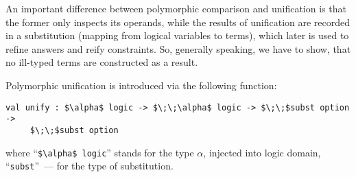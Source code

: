 \documentclass[10pt, oneside, nocopyrightspace]{sigplanconf}
\begin{document}
\begin{comment}
Like polymorphic comparison, polymorphic unification performs traversal
of values, exploiting intrinsic knowledge of their runtime representation. 
The undeniable benefit of this solution is that in order to perform unification 
for user types no ``boilerplate'' code is needed. 
\end{comment}
\begin{comment}
On the other hand, all pitfalls of
polymorphic comparison are inherited as well; in particular, unification can loop 
for cyclic data structures and does not work for functional values. Since we generally 
do not expect any reasonable outcome in these cases, the only remaining problem is that
the compiler is incapable to provide any assistance in identifying 
and avoiding them. Another drawback is that the implementation of polymorphic unification
relies on runtime representation of values and have to be fixed every time the representation changes. 
Finally, as it written in unsafe manner using \lstinline{Obj} interface, it has to be
carefully developed and tested.
\end{comment}

An important difference between polymorphic comparison and unification is that the former 
only inspects its operands, while the results of unification are recorded in a substitution
(mapping from logical variables to terms), which later is used to refine answers and reify 
constraints. So, generally speaking, we have to show, that no ill-typed terms are constructed 
as a result.

Polymorphic unification is introduced via the following function:

\begin{lstlisting}[mathescape=true]
   val unify : $\alpha$ logic -> $\;\;\alpha$ logic -> $\;\;$subst option -> 
     $\;\;$subst option
\end{lstlisting}

\noindent where ``\lstinline[mathescape=true]{$\alpha$ logic}'' stands for the type $\alpha$, 
injected into logic domain, ``\lstinline{subst}''~--- for the type of substitution. 

\begin{comment}
Unification can 
fail (hence ``\lstinline{option}'' in the result type), is performed in the context of
existing substitution (hence ``\lstinline{subst}'' in the third argument) and
can be chained (hence ``\lstinline{option}'' in the third argument). Note, that the 
type of substitution is not polymorphic, which means, that compiler completely looses the 
track of types for values, stored in a substitution. These types are recovered later during
refinement of answers.
\end{comment}
\end{document}
